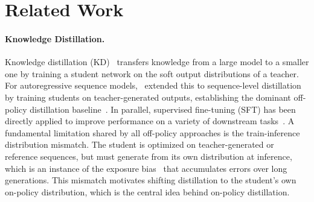 \section{Related Work}

\paragraph{Knowledge Distillation.}
Knowledge distillation (KD)~\citep{hinton2015distilling} transfers knowledge from a large model to a smaller one by training a student network on the soft output distributions of a teacher.
For autoregressive sequence models,~\citet{kim2016sequence} extended this to sequence-level distillation by training students on teacher-generated outputs, establishing the dominant off-policy distillation baseline~\citep{sanh2019distilbert,jiao2020tinybert,wang2020minilm}.
In parallel, supervised fine-tuning (SFT) has been directly applied to improve performance on a variety of downstream tasks~\citep{JMLR:v25:23-0870,sanh2021multitask,wei2021finetuned}.
A fundamental limitation shared by all off-policy approaches is the train-inference distribution mismatch. The student is optimized on teacher-generated or reference sequences, but must generate from its own distribution at inference, which is an instance of the exposure bias~\citep{bengio2015scheduled} that accumulates errors over long generations.
This mismatch motivates shifting distillation to the student's own on-policy distribution, which is the central idea behind on-policy distillation.


